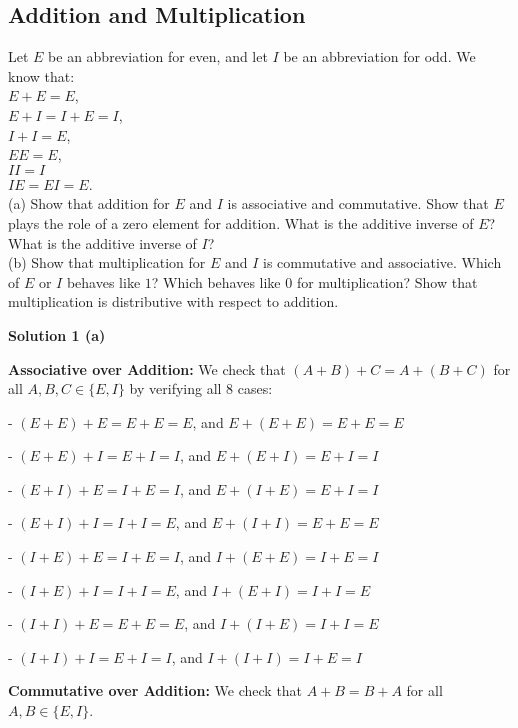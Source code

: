\subsection{Addition and Multiplication}

\begin{tcolorbox}[title=Problem 1, breakable]
    Let $E$ be an abbreviation for even, and let $I$ be an abbreviation for odd.
    We know that: \\
    $E + E = E$, \\
    $E + I = I + E = I$, \\
    $I + I = E$, \\
    $EE = E$, \\
    $II = I$ \\
    $IE = EI = E$. \\
    (a) Show that addition for $E$ and $I$ is associative and commutative.
    Show that $E$ plays the role of a zero element for addition. What is
    the additive inverse of $E$? What is the additive inverse of $I$? \\
    (b) Show that multiplication for $E$ and $I$ is commutative and associative.
    Which of $E$ or $I$ behaves like $1$? Which behaves like $0$ for multiplication? 
    Show that multiplication is distributive with respect to addition.
\end{tcolorbox}

\textbf{Solution 1 (a)}

\textbf{Associative over Addition:} We check that $(A + B) + C = A + (B + C)$ 
    for all $A, B, C \in \{E, I\}$ by verifying all 8 cases:

- $(E + E) + E = E + E = E$, and $E + (E + E) = E + E = E$

- $(E + E) + I = E + I = I$, and $E + (E + I) = E + I = I$

- $(E + I) + E = I + E = I$, and $E + (I + E) = E + I = I$

- $(E + I) + I = I + I = E$, and $E + (I + I) = E + E = E$

- $(I + E) + E = I + E = I$, and $I + (E + E) = I + E = I$

- $(I + E) + I = I + I = E$, and $I + (E + I) = I + I = E$

- $(I + I) + E = E + E = E$, and $I + (I + E) = I + I = E$

- $(I + I) + I = E + I = I$, and $I + (I + I) = I + E = I$

\textbf{Commutative over Addition:} We check that $A + B = B + A$
    for all $A, B \in \{E, I\}$.

